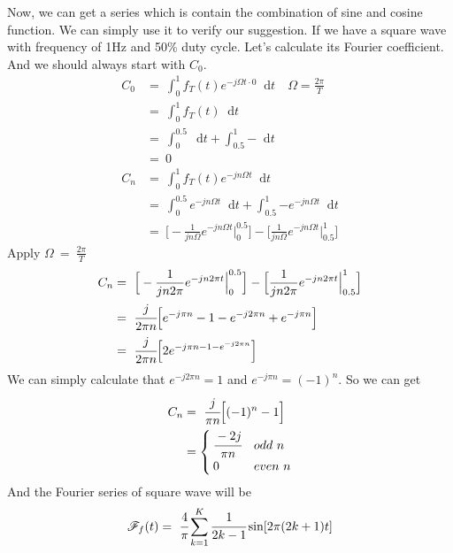 \documentclass[margin,line]{res}
\newcommand*{\dif}{\mathop{}\!\mathrm{d}}
\begin{document}
\begin{resume}
Now, we can get a series which is contain the combination of sine and cosine function. We can simply use it to verify our suggestion. If we have a square wave with frequency of 1Hz and 50\% duty cycle. Let's calculate its Fourier coefficient. And we should always start with $C_0$.
\begin{align}
C_0 &= \ \int_{0}^{1}{f_T(t) e^{-j\Omega t \cdot 0} \dif t} \quad \Omega=\frac{2\pi}{T} \nonumber \\
	&=\ \int_{0}^{1}{f_T(t) \dif t} \nonumber \\
	&=\ \int_{0}^{0.5}{\dif t} + \int_{0.5}^{1}{- \dif t} \nonumber \\
	&=\ 0 \nonumber \\
C_n &= \ \int_{0}^{1}{ f_T(t) e^{-jn\Omega t} \dif t} \nonumber \\
	&= \ \int_{0}^{0.5}{e^{-jn\Omega t} \dif t} +
		 \int_{0.5}^{1}{-e^{-jn\Omega t} \dif t} \nonumber \\
	&= \ \Big[-\frac{1}{jn\Omega} e^{-jn\Omega t}\Big|_{0}^{0.5} \Big] -
	   	 \Big[\frac{1}{jn\Omega} e^{-jn\Omega t}\Big|_{0.5}^{1} \Big] \nonumber
\end{align}
Apply $\Omega \ = \ \frac{2\pi}{T} $
\begin{align}
C_n	&= \ \Big[-\frac{1}{jn2\pi} e^{-jn2\pi t}\Big|_{0}^{0.5} \Big] -
		 \Big[\frac{1}{jn2\pi} e^{-jn2\pi t}\Big|_{0.5}^{1} \Big] \nonumber \\
	&= \ \cfrac{j}{2\pi n}\Big[ e^{-j\pi n} -1 -e^{-j2\pi n} +e^{-j\pi n} \Big] \nonumber \\
	&= \ \cfrac{j}{2\pi n}\Big[ 2e^{-j\pi n -1 -e^{-j2\pi n}} \Big] \nonumber
\end{align}
We can simply calculate that $e^{-j2\pi n}=1$ and $e^{-j\pi n}=(-1)^{n}$. So we can get
\begin{align}
C_n &= \ \cfrac{j}{\pi n}\Big[ (-1)^n-1 \Big] \nonumber \\
	&=\begin{cases}
		\cfrac{-2j}{\pi n}&  {odd \ n} \\
		0&  {even \ n}
 	  \end{cases}	\nonumber
\end{align}
And the Fourier series of square wave will be
$$
\mathscr{F}_f(t)= \ \cfrac{4}{\pi} \sum\limits_{k=1}^K{\cfrac{1}{2k-1} \sin [2\pi (2k+1)t]}
$$
\begin{figure}[H]
	\centerline{}
\end{figure}
\clearpage


\end{resume}
\end{document}
